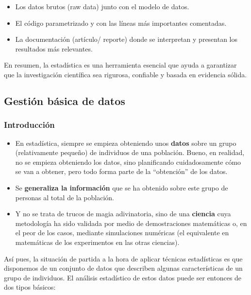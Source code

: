 \documentclass[
  letterpaper,
  DIV=11,
  numbers=noendperiod]{scrreprt}
\begin{document}
\begin{itemize}
  \begin{itemize}
  \item
    Los datos brutos (raw data) junto con el modelo de datos.
  \item
    El código parametrizado y con las líneas más importantes comentadas.
  \item
    La documentación (artículo/ reporte) donde se interpretan y
    presentan los resultados más relevantes.
  \end{itemize}
\end{itemize}

En resumen, la estadística es una herramienta esencial que ayuda a
garantizar que la investigación científica sea rigurosa, confiable y
basada en evidencia sólida.

\hypertarget{gestiuxf3n-buxe1sica-de-datos}{%
\subsection{Gestión básica de
datos}\label{gestiuxf3n-buxe1sica-de-datos}}

\hypertarget{introducciuxf3n}{%
\subsubsection{Introducción}\label{introducciuxf3n}}

\begin{itemize}
\item
  En estadística, siempre se empieza obteniendo unos \textbf{datos}
  sobre un grupo (relativamente pequeño) de individuos de una población.
  Bueno, en realidad, no se empieza obteniendo los datos, sino
  planificando cuidadosamente cómo se van a obtener, pero todo forma
  parte de la ``obtención'' de los datos.
\item
  Se \textbf{generaliza la información} que se ha obtenido sobre este
  grupo de personas al total de la población.
\item
  Y no se trata de trucos de magia adivinatoria, sino de una
  \textbf{ciencia} cuya metodología ha sido validada por medio de
  demostraciones matemáticas o, en el peor de los casos, mediante
  simulaciones numéricas (el equivalente en matemáticas de los
  experimentos en las otras ciencias).
\end{itemize}

Así pues, la situación de partida a la hora de aplicar técnicas
estadísticas es que disponemos de un conjunto de datos que describen
algunas características de un grupo de individuos. El análisis
estadístico de estos datos puede ser entonces de dos tipos básicos:
\end{document}
